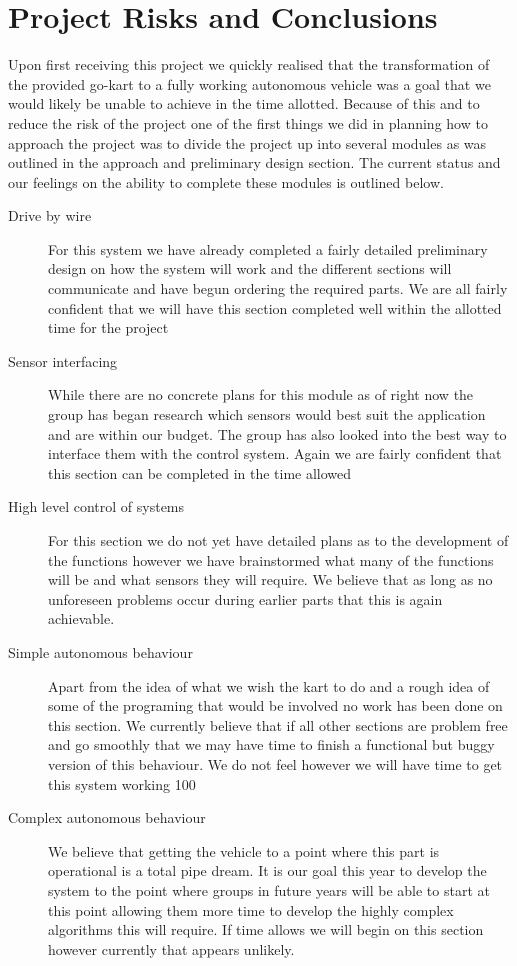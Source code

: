 \chapter{Project Risks and Conclusions}

Upon first receiving this project we quickly realised that the transformation of the provided go-kart to a fully working autonomous vehicle was a goal that we would likely be unable to achieve in the time allotted. Because of this and to reduce the risk of the project one of the first things we did in planning how to approach the project was to divide the project up into several modules as was outlined in the approach and preliminary design section. The current status and our feelings on the ability to complete these modules is outlined below.

\begin{description}
\item[Drive by wire] For this system we have already completed a fairly detailed preliminary design on how the system will work and the different sections will communicate and have begun ordering the required parts. We are all fairly confident that we will have this section completed well within the allotted time for the project

\item[Sensor interfacing] While there are no concrete plans for this module as of right now the group has began research which sensors would best suit the application and are within our budget. The group has also looked into the best way to interface them with the control system. Again we are fairly confident that this section can be completed in the time allowed

\item[High level control of systems] For this section we do not yet have detailed plans as to the development of the functions however we have brainstormed what many of the functions will be and what sensors they will require. We believe that as long as no unforeseen problems occur during earlier parts that this is again achievable.

\item[Simple autonomous behaviour] Apart from the idea of what we wish the kart to do and a rough idea of some of the programing that would be involved no work has been done on this section. We currently believe that if all other sections are problem free and go smoothly that we may have time to finish a functional but buggy version of this behaviour. We do not feel however we will have time to get this system working 100%

\item[Complex autonomous behaviour] We believe that getting the vehicle to a point where this part is operational is a total pipe dream. It is our goal this year to develop the system to the point where groups in future years will be able to start at this point allowing them more time to develop the highly complex algorithms this will require. If time allows we will begin on this section however currently that appears unlikely.
\end{description}